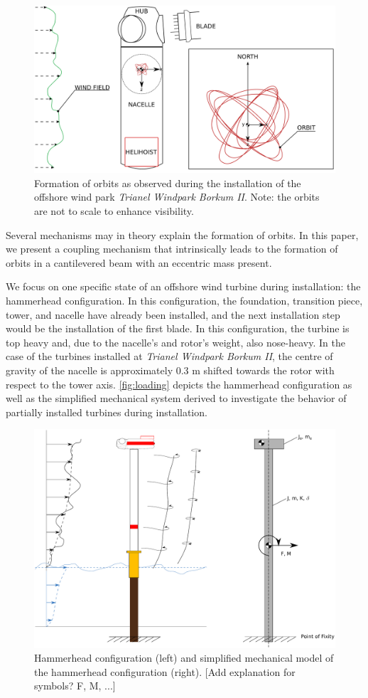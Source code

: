 \documentclass{article}
\begin{document}
\begin{figure}[ht!]
    \centering
    \includegraphics[width=0.7\linewidth]{figures/installation_alt2.png}
    \caption{Formation of orbits as observed during the installation of the offshore wind park \textit{Trianel Windpark Borkum II}. Note: the orbits are not to scale to enhance visibility.}
    \label{fig:orbit}
\end{figure}

Several mechanisms may in theory explain the formation of orbits. In this paper, we present a coupling mechanism that intrinsically leads to the formation of orbits in a cantilevered beam with an eccentric mass present. 

We focus on one specific state of an offshore wind turbine during installation: the hammerhead configuration. In this configuration, the foundation, transition piece, tower, and nacelle have already been installed, and the next installation step would be the installation of the first blade. In this configuration, the turbine is top heavy and, due to the nacelle's and rotor's weight, also nose-heavy. In the case of the turbines installed at \textit{Trianel Windpark Borkum II}, the centre of gravity of the nacelle is approximately 0.3 m shifted towards the rotor with respect to the tower axis. \autoref{fig:loading} depicts the hammerhead configuration as well as the simplified mechanical system derived to investigate the behavior of partially installed turbines during installation. 

\begin{figure}[ht!]
    \centering
    \includegraphics[width=0.7\linewidth]{figures/loading_3.pdf}
    \caption{Hammerhead configuration (left) and simplified mechanical model of the hammerhead configuration (right). [Add explanation for symbols? F, M, ...]}
    \label{fig:loading}
\end{figure}
\end{document}
